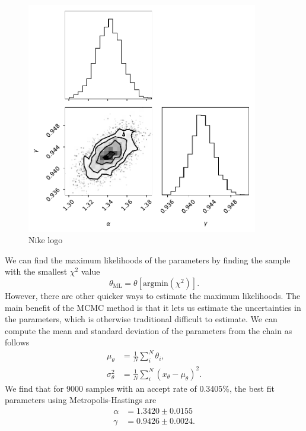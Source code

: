 \documentclass{article}
\begin{document}
\begin{figure}
    \centering
    \includegraphics[width=0.9\textwidth]{figs/mh_corner.pdf}
    \caption{Nike logo}
    \label{fig:mh_corner}
\end{figure}

We can find the maximum likelihoods of the parameters by finding the sample with the smallest $\chi^2$ value
\begin{equation}
    \theta_\mathrm{ML} = \theta[\mathrm{argmin}(\chi^2)].
\end{equation}
However, there are other quicker ways to estimate the maximum likelihoods. The main benefit of the MCMC method is that it lets us estimate the uncertainties in the parameters, which is otherwise traditional difficult to estimate. We can compute the mean and standard deviation of the parameters from the chain as follows
\begin{align}
    \mu_\theta &= \frac{1}{N} \sum_i^N \theta_i,\\
    \sigma_\theta^2 &= \frac{1}{N} \sum_i^N (x_\theta - \mu_\theta)^2.
\end{align}
We find that for 9000 samples with an accept rate of 0.3405\%, the best fit parameters using Metropolis-Hastings are
\begin{align*}
    \alpha &= 1.3420 \pm  0.0155\\
    \gamma &= 0.9426 \pm  0.0024.
\end{align*}
\end{document}
